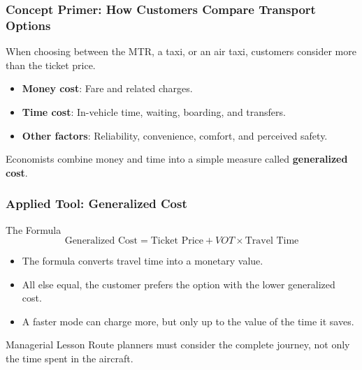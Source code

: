 \documentclass{beamer}
\begin{document}
\begin{frame}[t]
  \frametitle{Concept Primer: How Customers Compare Transport Options}
  When choosing between the MTR, a taxi, or an air taxi, customers consider more than the ticket price.
  \begin{itemize}
    \item \textbf{Money cost}: Fare and related charges.
    \item \textbf{Time cost}: In-vehicle time, waiting, boarding, and transfers.
    \item \textbf{Other factors}: Reliability, convenience, comfort, and perceived safety.
  \end{itemize}
  \vspace{0.35cm}
  Economists combine money and time into a simple measure called \textbf{generalized cost}.
\end{frame}

\begin{frame}[t]
  \frametitle{Applied Tool: Generalized Cost}
  \begin{block}{The Formula}
  \[
    \text{Generalized Cost}=\text{Ticket Price}+VOT\times\text{Travel Time}
  \]
  \end{block}
  \begin{itemize}
    \item The formula converts travel time into a monetary value.
    \item All else equal, the customer prefers the option with the lower generalized cost.
    \item A faster mode can charge more, but only up to the value of the time it saves.
  \end{itemize}
  \begin{block}{Managerial Lesson}
    Route planners must consider the complete journey, not only the time spent in the aircraft.
  \end{block}
\end{frame}
\end{document}

